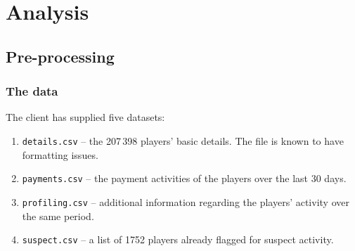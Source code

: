 \documentclass[11pt]{article} %
\begin{document}
\section{Analysis}

\subsection{Pre-processing}

\subsubsection{The data}

The client has supplied five datasets:
\begin{enumerate}
\item {\tt details.csv} -- the 207\,398 players’ basic details. The file is known to have formatting issues.

\item {\tt payments.csv} -- the payment activities of the players over the last 30 days.

\item {\tt profiling.csv} -- additional information regarding the players' activity over the same period. 

\item {\tt suspect.csv} -- a list of 1752 players already flagged for suspect activity.

\end{enumerate}
\end{document}
